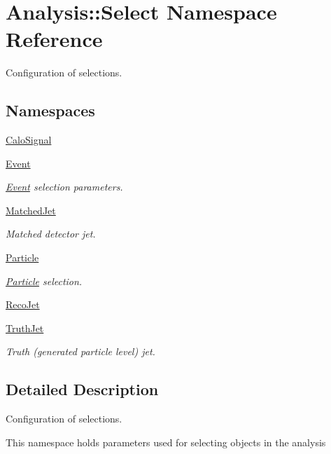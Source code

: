 \hypertarget{namespaceAnalysis_1_1Select}{}\section{Analysis\+:\+:Select Namespace Reference}
\label{namespaceAnalysis_1_1Select}


Configuration of selections.  


\subsection*{Namespaces}
\begin{DoxyCompactItemize}
\item 
 \hyperlink{namespaceAnalysis_1_1Select_1_1CaloSignal}{Calo\+Signal}
\item 
 \hyperlink{namespaceAnalysis_1_1Select_1_1Event}{Event}
\begin{DoxyCompactList}\small\item\em \hyperlink{namespaceAnalysis_1_1Select_1_1Event}{Event} selection parameters. \end{DoxyCompactList}\item 
 \hyperlink{namespaceAnalysis_1_1Select_1_1MatchedJet}{Matched\+Jet}
\begin{DoxyCompactList}\small\item\em Matched detector jet. \end{DoxyCompactList}\item 
 \hyperlink{namespaceAnalysis_1_1Select_1_1Particle}{Particle}
\begin{DoxyCompactList}\small\item\em \hyperlink{namespaceAnalysis_1_1Select_1_1Particle}{Particle} selection. \end{DoxyCompactList}\item 
 \hyperlink{namespaceAnalysis_1_1Select_1_1RecoJet}{Reco\+Jet}
\item 
 \hyperlink{namespaceAnalysis_1_1Select_1_1TruthJet}{Truth\+Jet}
\begin{DoxyCompactList}\small\item\em Truth (generated particle level) jet. \end{DoxyCompactList}\end{DoxyCompactItemize}


\subsection{Detailed Description}
Configuration of selections. 

This namespace holds parameters used for selecting objects in the analysis 